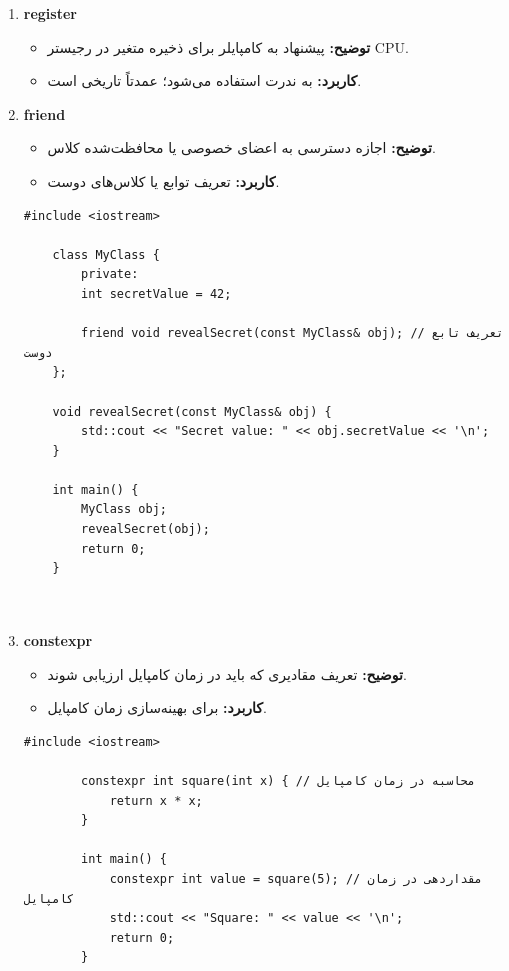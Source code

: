 \documentclass[12pt, a4paper]{report}
\begin{document}
\begin{enumerate}
\begin{lstlisting}[breaklines=true]
	\end{lstlisting}
	\RTL
	\item \textbf{register}
	\begin{itemize}
		\item \textbf{توضیح:} پیشنهاد به کامپایلر برای ذخیره متغیر در رجیستر CPU.
		\item \textbf{کاربرد:} به ندرت استفاده می‌شود؛ عمدتاً تاریخی است.
	\end{itemize}
	\item \textbf{friend}
	\begin{itemize}
		\item \textbf{توضیح:} اجازه دسترسی به اعضای خصوصی یا محافظت‌شده کلاس.
		\item \textbf{کاربرد:} تعریف توابع یا کلاس‌های دوست.
	\end{itemize}
		\LTR
	\begin{lstlisting}[breaklines=true]
	#include <iostream>
	
	class MyClass {
		private:
		int secretValue = 42;
		
		friend void revealSecret(const MyClass& obj); // تعریف تابع دوست
	};
	
	void revealSecret(const MyClass& obj) {
		std::cout << "Secret value: " << obj.secretValue << '\n';
	}
	
	int main() {
		MyClass obj;
		revealSecret(obj);
		return 0;
	}
	
		
	\end{lstlisting}
	\RTL
	\item \textbf{constexpr}
	\begin{itemize}
		\item \textbf{توضیح:} تعریف مقادیری که باید در زمان کامپایل ارزیابی شوند.
		\item \textbf{کاربرد:} برای بهینه‌سازی زمان کامپایل.
	\end{itemize}
		\LTR
	\begin{lstlisting}[breaklines=true]
		#include <iostream>
		
		constexpr int square(int x) { // محاسبه در زمان کامپایل
			return x * x;
		}
		
		int main() {
			constexpr int value = square(5); // مقداردهی در زمان کامپایل
			std::cout << "Square: " << value << '\n';
			return 0;
		}
		

\end{lstlisting}
\end{enumerate}
\end{document}
